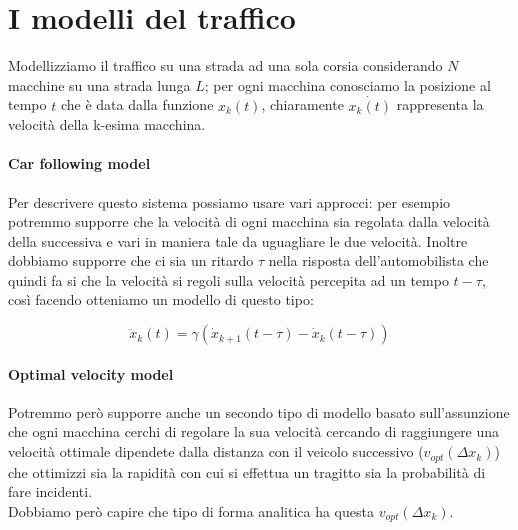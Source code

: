 \section{I modelli del traffico}
\begin{center}
\end{center}

Modellizziamo il traffico su una strada ad una sola corsia considerando $N$ macchine su una strada lunga $L$; per ogni macchina conosciamo la posizione al tempo $t$ che è data dalla funzione $x_k(t)$, chiaramente $\dot{x_k(t)}$ rappresenta la velocità della k-esima macchina.
\paragraph{Car following model}
Per descrivere questo sistema possiamo usare vari approcci: per esempio potremmo supporre che la velocità di ogni macchina sia regolata dalla velocità della successiva e vari in maniera tale da uguagliare le due velocità.
 Inoltre dobbiamo supporre che ci sia un ritardo $\tau$ nella risposta dell'automobilista che quindi fa si che la velocità si regoli sulla velocità percepita ad un tempo $t-\tau$, così facendo otteniamo un modello di questo tipo:

\begin{equation}
	\ddot{x}_k(t)=\gamma(\dot{x}_{k+1}(t-\tau)-\dot{x}_{k}(t-\tau))
			 \label{diifeqcarfollowing}
\end{equation}
\paragraph{Optimal velocity model}Potremmo però supporre anche un secondo tipo di modello basato sull'assunzione che ogni macchina cerchi di regolare la sua velocità cercando di raggiungere una velocità ottimale dipendete dalla distanza con il veicolo successivo ($v_{opt}(\Delta x_k)$) che ottimizzi sia la rapidità con cui si effettua un tragitto sia la probabilità di fare incidenti. \\ Dobbiamo però capire che tipo di forma analitica ha questa $v_{opt}(\Delta x_k)$. 

